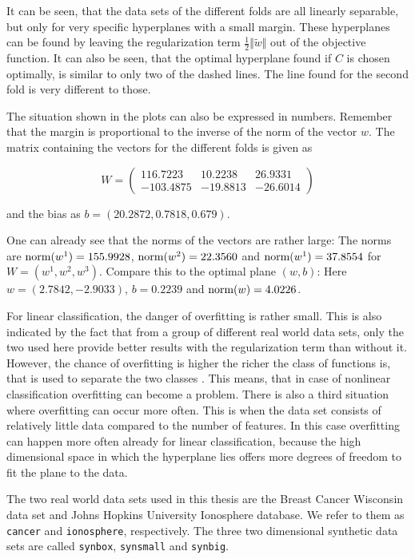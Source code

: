 It can be seen, that the data sets of the different folds are all linearly separable, but only for very specific hyperplanes with a small margin.
These hyperplanes can be found by leaving the regularization term \(\frac{1}{2}\Vert \tilde{w}\Vert\) out of the objective function.
It can also be seen, that the optimal hyperplane found if \(C\) is chosen optimally, is similar to only two of the dashed lines. The line found for the second fold is very different to those.

The situation shown in the plots can also be expressed in numbers. Remember that the margin is proportional to the inverse of the norm of the vector \(w\). The matrix containing the vectors for the different folds is given as

\[ W = \begin{pmatrix} 116.7223 & 10.2238 & 26.9331 \\
                      -103.4875 & -19.8813& -26.6014\end{pmatrix}\]

and the bias as \(b = ( 20.2872, 0.7818, 0.679)\).
											
One can already see that the norms of the vectors are rather large: The norms are \(\textup{norm}(w^1)= 155.9928\), \(\textup{norm}(w^2)= 22.3560\) and \(\textup{norm}(w^1)= 37.8554\) for \(W = (w^{1},w^2,w^3)\).
Compare this to the optimal plane \((w,b)\): Here \(w = (2.7842, -2.9033)\), \(b =0.2239\) and \(\textup{norm}(w)=4.0226\).

For linear classification, the danger of overfitting is rather small. This is also indicated by the fact that from a group of different real world data sets, only the two used here provide better results with the regularization term than without it.
However, the chance of overfitting is higher the richer the class of functions is, that is used to separate the two classes \cite[p. 2-4]{Kunapuli2008}. This means, that in case of nonlinear classification overfitting can become a problem. 
There is also a third situation where overfitting can occur more often. This is when the data set consists of relatively little data compared to the number of features. In this case overfitting can happen more often already for linear classification, because the high dimensional space in which the hyperplane lies offers more degrees of freedom to fit the plane to the data.

The two real world data sets used in this thesis are the Breast Cancer Wisconsin data set and Johns Hopkins University Ionosphere database. We refer to them as \texttt{cancer} and \texttt{ionosphere}, respectively.
The three two dimensional synthetic data sets are called \texttt{synbox}, \texttt{synsmall} and \texttt{synbig}.

